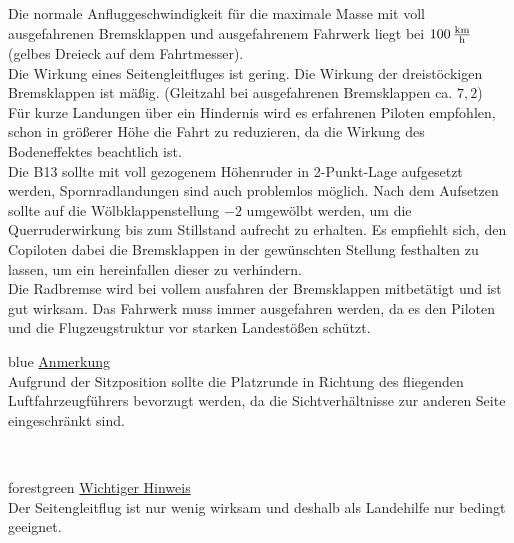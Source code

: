 Die normale Anfluggeschwindigkeit für die maximale Masse mit voll ausgefahrenen Bremsklappen und ausgefahrenem Fahrwerk liegt bei $\unit[100]{\frac{km}{h}}$ (gelbes Dreieck auf dem Fahrtmesser).\\
Die Wirkung eines Seitengleitfluges ist gering. Die Wirkung der dreistöckigen Bremsklappen ist mäßig. (Gleitzahl bei ausgefahrenen Bremsklappen ca. $7,2$) \\
Für kurze Landungen über ein Hindernis wird es erfahrenen Piloten empfohlen, schon in größerer Höhe die Fahrt zu reduzieren, da die Wirkung des Bodeneffektes beachtlich ist.\\
Die B13 sollte mit voll gezogenem Höhenruder in 2-Punkt-Lage aufgesetzt werden, Spornradlandungen sind auch problemlos möglich. Nach dem Aufsetzen sollte auf die Wölbklappenstellung $-2$ umgewölbt werden, um die Querruderwirkung bis zum Stillstand aufrecht zu erhalten. Es empfiehlt sich, den Copiloten dabei die Bremsklappen in der gewünschten Stellung festhalten zu lassen, um ein hereinfallen dieser zu verhindern. \\
Die Radbremse wird bei vollem ausfahren der Bremsklappen mitbetätigt und ist gut wirksam.
Das Fahrwerk muss immer ausgefahren werden, da es den Piloten und die Flugzeugstruktur vor starken Landestößen schützt.\\
\newline
\begin{color}{blue}
\large{\underline{Anmerkung}}\\
Aufgrund der Sitzposition sollte die Platzrunde in Richtung des fliegenden Luftfahrzeugführers bevorzugt werden, da die Sichtverhältnisse zur anderen Seite eingeschränkt sind.
\end{color}\\
\newline
\begin{color}{forestgreen}
\large{\underline{Wichtiger Hinweis}}\\
Der Seitengleitflug ist nur wenig wirksam und deshalb als Landehilfe nur bedingt geeignet.
\end{color}\\
